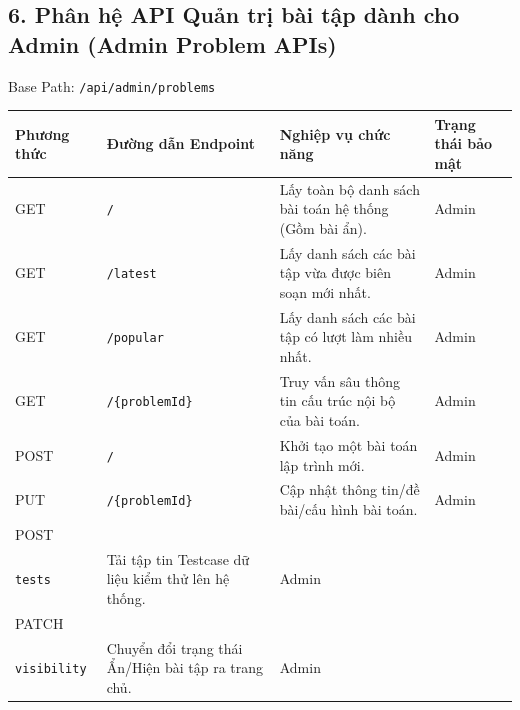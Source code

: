 \documentclass[12pt,a4paper]{article}
\makeatletter
\renewcommand{\_}{\BreakableUnderscore}
\newcommand{\tablecelllines}[1]{\begin{tabular}[t]{@{}l@{}}#1\end{tabular}}
\makeatother
\begin{document}
\subsection{6. Phân hệ API Quản trị bài tập dành cho Admin (Admin Problem APIs)}

Base Path: \texttt{/api/admin/problems}

\begin{longtable}[]{
  |>{\raggedright\arraybackslash}p{}
  |>{\raggedright\arraybackslash}p{}
  |>{\raggedright\arraybackslash}p{}
  |>{\raggedright\arraybackslash}p{}|}
\hline\rowcolor{tableHeader}
\begin{minipage}[b]{\linewidth}\raggedright
Phương thức
\end{minipage} & \begin{minipage}[b]{\linewidth}\raggedright
Đường dẫn Endpoint
\end{minipage} & \begin{minipage}[b]{\linewidth}\raggedright
Nghiệp vụ chức năng
\end{minipage} & \begin{minipage}[b]{\linewidth}\raggedright
Trạng thái bảo mật
\end{minipage} \\
\hline
\endhead
\hline
\endlastfoot
GET & \texttt{/} & Lấy toàn bộ danh sách bài toán hệ thống (Gồm bài ẩn). & Admin \\
\hline
GET & \texttt{/latest} & Lấy danh sách các bài tập vừa được biên soạn mới nhất. & Admin \\
\hline
GET & \texttt{/popular} & Lấy danh sách các bài tập có lượt làm nhiều nhất. & Admin \\
\hline
GET & \texttt{/\{problemId\}} & Truy vấn sâu thông tin cấu trúc nội bộ của bài toán. & Admin \\
\hline
POST & \texttt{/} & Khởi tạo một bài toán lập trình mới. & Admin \\
\hline
PUT & \texttt{/\{problemId\}} & Cập nhật thông tin/đề bài/cấu hình bài toán. & Admin \\
\hline
POST & \tablecelllines{\texttt{/\{problemId\}/}\\\texttt{tests}} & Tải tập tin Testcase dữ liệu kiểm thử lên hệ thống. & Admin \\
\hline
PATCH & \tablecelllines{\texttt{/\{problemId\}/}\\\texttt{visibility}} & Chuyển đổi trạng thái Ẩn/Hiện bài tập ra trang chủ. & Admin \\
\hline
\end{longtable}
\end{document}
